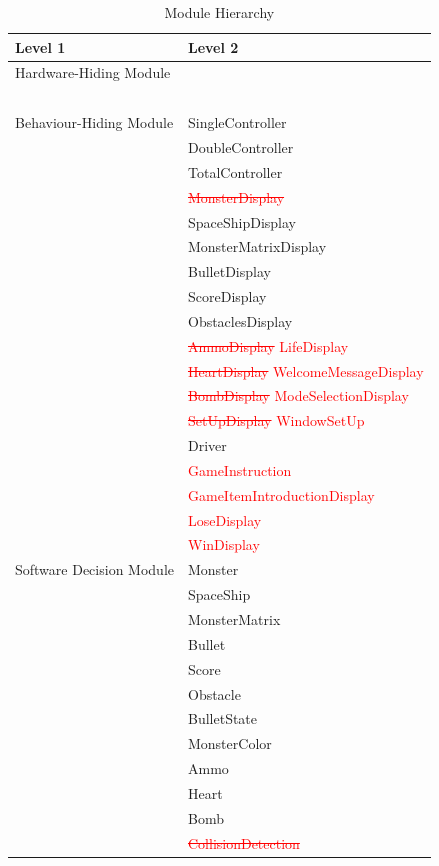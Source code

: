 \documentclass[12pt]{article}
\begin{document}
\begin{table}[H]
\centering
\begin{tabular}{p{} p{}}
\toprule
\textbf{Level 1} & \textbf{Level 2}\\
\midrule

{Hardware-Hiding Module} & ~ \\
& ~ \\
\midrule

{Behaviour-Hiding Module} & SingleController\\
& DoubleController\\
& TotalController \\
& \textcolor{red}{\st{MonsterDisplay}} \\
& SpaceShipDisplay \\
& MonsterMatrixDisplay \\ 
& BulletDisplay \\
& ScoreDisplay \\
& ObstaclesDisplay\\
& \textcolor{red}{\st{AmmoDisplay} LifeDisplay}\\
& \textcolor{red}{\st{HeartDisplay} WelcomeMessageDisplay}\\
& \textcolor{red}{\st{BombDisplay} ModeSelectionDisplay}\\
& \textcolor{red}{\st{SetUpDisplay} WindowSetUp}\\
& Driver\\
& \textcolor{red}{GameInstruction}\\
& \textcolor{red}{GameItemIntroductionDisplay}\\
& \textcolor{red}{LoseDisplay}\\
& \textcolor{red}{WinDisplay}\\
\midrule

{Software Decision Module} & Monster\\
& SpaceShip\\
& MonsterMatrix\\
& Bullet\\
& Score\\
& Obstacle\\
& BulletState\\
& MonsterColor\\
& Ammo\\
& Heart\\
& Bomb\\
& \textcolor{red}{\st{CollisionDetection}}\\
\bottomrule

\end{tabular}
\caption{Module Hierarchy}
\label{TblMH}
\end{table}
\end{document}
